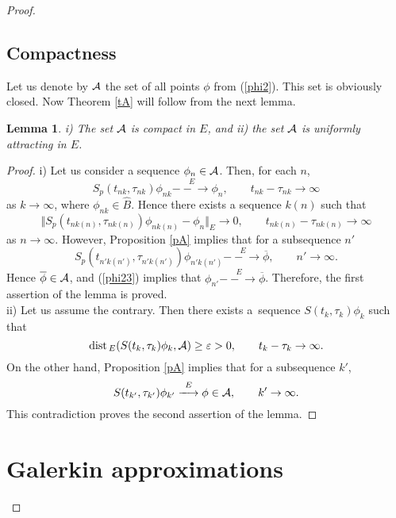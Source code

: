 \documentclass[11pt]{article}
\newtheorem{lemma}[theorem]{Lemma}
\newcommand{\cA}{{\cal A}}
\newcommand{\st}{\stackrel}
\newcommand{\toE}{\st{E}{-\!\!\!-\!\!\!\to}}
\newcommand{\ve}{\varepsilon}
\newcommand{\dist}{{\rm dist\5}}
\newcommand{\ov}{\overline}
\newcommand{\5}{{\hspace{0.5mm}}}
\numberwithin{equation}{section}
\newcommand{\la}{\label}
\newcommand{\be}{\begin{equation}}
\newcommand{\ee}{\end{equation}}
\newcommand{\bl}{\begin{lemma}}
\newcommand{\el}{\end{lemma}}
\numberwithin{equation}{section}
\begin{document}
\begin{proof}
\subsection{Compactness}
Let us denote by $\cA$ the set of all points $\phi$ from (\ref{phi2}). This set is obviously closed.
Now Theorem \ref{tA} will follow from the next lemma.
\bl
{\rm i)} The set $\cA$ is compact in $E$,
and
{\rm ii)} the set $\cA$ is uniformly attracting in $E$.
\el
\begin{proof}
i) Let  us consider a sequence $\phi_n\in\cA$. Then, for each $n$, 
\be\la{phi22}
S_p(t_{nk},\tau_{nk})\phi_{nk}\toE \phi_n,\qquad t_{nk}-\tau_{nk}\to\infty
\ee
as $k\to\infty$,
where $\phi_{nk}\in \hat B$. Hence there exists a sequence $k(n)$ such  that
\be\la{phi23}
\Vert S_p(t_{nk(n)},\tau_{nk(n)})\phi_{nk(n)}- \phi_n\Vert_E\to 0,
\qquad t_{nk(n)}-\tau_{nk(n)}\to\infty
\ee
as $n\to\infty$.
However, Proposition \ref{pA} implies that for a subsequence $n'$
\be\la{phi24}
S_p(t_{n'k(n')},\tau_{n'k(n')})\phi_{n'k(n')}\toE \ov\phi,\qquad n'\to\infty.
\ee
Hence $\ov\phi\in\cA$, and (\ref{phi23}) implies that $\phi_{n'}\toE \ov\phi$.
Therefore, the first assertion of the lemma is proved.
\smallskip\\
ii) Let us assume the contrary. Then there exists  a~sequence 
$S(t_k,\tau_k)\phi_k$ such that
\be\la{seq}
\dist_E(S(t_k,\tau_k)\phi_k,\cA)\ge\ve>0,\qquad t_k-\tau_k\to\infty.
\ee
On the other hand, Proposition \ref{pA} implies that for a subsequence
$k'$,
\be\la{seq2}
S(t_{k'},\tau_{k'})\phi_{k'}\toE \phi\in\cA,\qquad k'\to\infty.
\ee
This contradiction proves the second assertion of the lemma.
\end{proof}









\appendix

\setcounter{section}{0}
\setcounter{equation}{0}
\protect{}
\protect{}
\protect{}
\protect{}


\section{Galerkin approximations}\la{A}



\end{proof}
\end{document}

